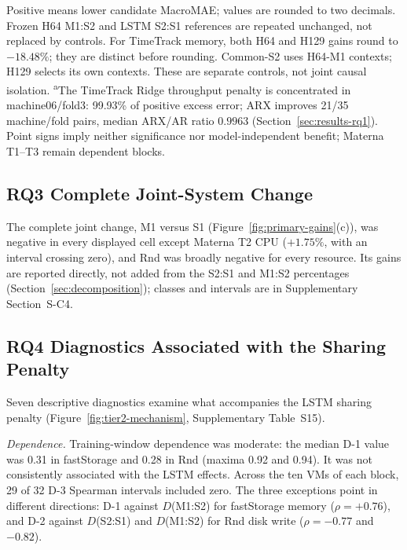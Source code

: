 \documentclass[5p,twocolumn]{elsarticle}
\begin{document}
\begin{table}[t]
\begin{tabular*}{\textwidth}{@{\extracolsep{\fill}}lrrrr@{}}
    \bottomrule
  \end{tabular*}
  \vspace{2pt}
  \parbox{\textwidth}{\footnotesize Positive means lower candidate MacroMAE; values are rounded to two decimals.
  Frozen H64 M1:S2 and LSTM S2:S1 references are repeated unchanged, not replaced by controls.
  For TimeTrack memory, both H64 and H129 gains round to $-18.48\%$; they are distinct before rounding.
  Common-S2 uses H64-M1 contexts; H129 selects its own contexts. These are separate controls, not joint causal isolation.
  \textsuperscript{a}The TimeTrack Ridge throughput penalty is concentrated in machine06/fold3:
  99.93\% of positive excess error; ARX improves 21/35 machine/fold pairs, median ARX/AR ratio $0.9963$ (Section~\ref{sec:results-rq1}).
  Point signs imply neither significance nor model-independent benefit; Materna T1--T3 remain dependent blocks.}
\end{table}

\subsection{RQ3 Complete Joint-System Change}
\label{sec:results-rq3}

The complete joint change, M1 versus S1 (Figure~\ref{fig:primary-gains}(c)),
was negative in every displayed cell except Materna T2 CPU ($+1.75\%$, with an
interval crossing zero), and Rnd was broadly negative for every resource. Its
gains are reported directly, not added from the S2:S1 and M1:S2 percentages
(Section~\ref{sec:decomposition}); classes and intervals are in Supplementary
Section~S-C4.

\subsection{RQ4 Diagnostics Associated with the Sharing Penalty}
\label{sec:results-diagnostics}

Seven descriptive diagnostics examine what accompanies the LSTM sharing
penalty (Figure~\ref{fig:tier2-mechanism}, Supplementary
Table~S15).

\emph{Dependence.} Training-window dependence was moderate: the median D-1
value was 0.31 in fastStorage and 0.28 in Rnd (maxima 0.92 and 0.94). It was
not consistently associated with the LSTM effects. Across the ten VMs of
each block, 29 of 32 D-3 Spearman intervals included zero. The three
exceptions point in different directions: D-1 against $D$(M1:S2) for
fastStorage memory ($\rho=+0.76$), and D-2 against $D$(S2:S1) and
$D$(M1:S2) for Rnd disk write ($\rho=-0.77$ and $-0.82$).
\end{document}
